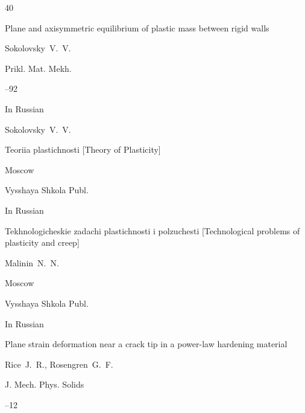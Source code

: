 \begin{thebibliography}{40}




\paper Plane and axisymmetric equilibrium of plastic mass between rigid walls 

\by Sokolovsky~V.~V.

\jour Prikl. Mat. Mekh.




--92

\lang In Russian




\by Sokolovsky~V.~V.

\book Teoriia plastichnosti \rm [Theory of Plasticity]

\publaddr Moscow

\publ Vysshaya Shkola Publ.



\lang In Russian




\book Tekhnologicheskie zadachi plastichnosti i polzuchesti \rm [Technological problems of plasticity and creep]

\by Malinin~N.~N.

\publaddr Moscow

\publ Vysshaya Shkola Publ.



\lang In Russian




\paper Plane strain deformation near a crack tip in a power-law hardening material

\by    Rice~J.~R., Rosengren~G.~F.

\jour J. Mech. Phys. Solids




--12





\end{thebibliography}
